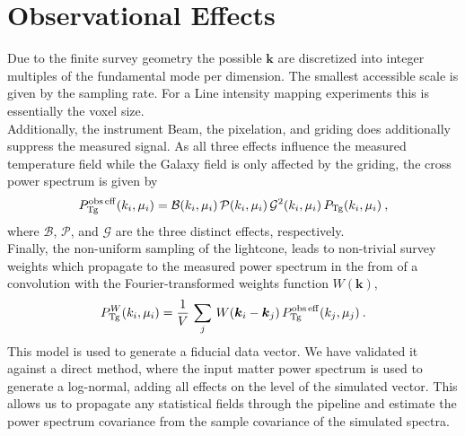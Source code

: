 \documentclass{article}
\begin{document}
\section{Observational Effects}
    Due to the finite survey geometry the possible $\boldsymbol{k}$ are discretized into integer multiples of the fundamental mode per dimension. The smallest accessible scale is given by the sampling rate. For a Line intensity mapping experiments this is essentially the voxel size.\\
    Additionally, the instrument Beam, the pixelation, and griding does additionally suppress the measured signal. As all three effects influence the measured temperature field while the Galaxy field is only affected by the griding, the cross power spectrum is given by
    \begin{equation}
        P_{\rm Tg}^{\rm obs\,eff}(k_i, \mu_i) = \mathcal{B}(k_i, \mu_i)\, \mathcal{P}(k_i, \mu_i)\, \mathcal{G}^2(k_i, \mu_i)\,P_{\rm Tg}(k_i, \mu_i)\:,
    \end{equation}
    where $\mathcal{B}$, $\mathcal{P}$, and $\mathcal{G}$ are the three distinct effects, respectively.\\
    Finally, the non-uniform sampling of the lightcone, leads to non-trivial survey weights which propagate to the measured power spectrum in the from of a convolution with the Fourier-transformed weights function $W(\boldsymbol{k})$,
    \begin{equation}
        P^{W}_{\rm Tg}(k_i,\mu_i) = \frac{1}{V}\,\sum_j\,W(\boldsymbol{k}_i-\boldsymbol{k}_j)\,P_{\rm Tg}^{\rm obs\,eff}(k_j, \mu_j)\:.
    \end{equation}
    This model is used to generate a fiducial data vector. We have validated it against a direct method, where the input matter power spectrum is used to generate a log-normal, adding all effects on the level of the simulated vector. This allows us to propagate any statistical fields through the pipeline and estimate the power spectrum covariance from the sample covariance of the simulated spectra.
\end{document}
